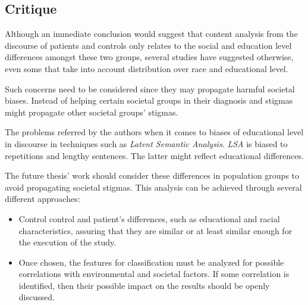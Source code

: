 \documentclass{Paper_Summary}
\begin{document}
\makepapertitle

\breakline

\begin{center}
    \section*{Critique}
\end{center}

    Although an immediate conclusion would suggest that content analysis from the discourse of patients and controls only relates to the social and education level differences amongst these two groups, several studies have suggested otherwise, even some that take into account distribution over race and educational level.

    Such concerns need to be considered since they may propagate harmful societal biases. Instead of helping certain societal groups in their diagnosis and stigmas might propagate other societal groups' stigmas.

    The problems referred by the authors when it comes to biases of educational level in discourse in techniques such as \emph{Latent Semantic Analysis}. \emph{LSA} is biased to repetitions and lengthy sentences. The latter might reflect educational differences.

    The future thesis' work should consider these differences in population groups to avoid propagating societal stigmas. This analysis can be achieved through several different approaches:
    \begin{itemize}
        \item Control control and patient's differences, such as educational and racial characteristics, assuring that they are similar or at least similar enough for the execution of the study.
        \item Once chosen, the features for classification must be analyzed for possible correlations with environmental and societal factors. If some correlation is identified, then their possible impact on the results should be openly discussed.
    \end{itemize}

\breakline
\end{document}
